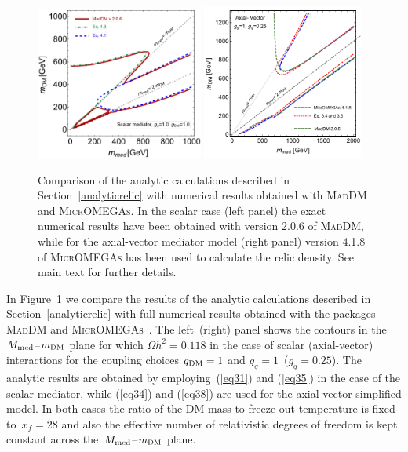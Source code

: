 \documentclass[a4paper, 11pt,notoc]{article}
\newcommand{\maddm}{\textsc{MadDM}\xspace}
\begin{document}
\begin{center}
\begin{figure}[t!]
\includegraphics[width=0.49\textwidth]{scalar_mediator_omegah2.pdf}
\includegraphics[width=0.47\textwidth]{AV_comparison2.pdf} 
\caption{Comparison of the analytic calculations described in Section~\ref{analyticrelic}  with numerical results obtained with \maddm and \textsc{MicrOMEGAs}. In the scalar case (left panel) the exact numerical results have been obtained with version 2.0.6 of \maddm, while for the axial-vector mediator model (right panel)
version 4.1.8 of \textsc{MicrOMEGAs} has been used to calculate the relic density. See main text for further details.}
\label{fig:analcalc}
\end{figure}
\end{center}

In Figure~\ref{fig:analcalc} we compare the results of the analytic calculations described in Section~\ref{analyticrelic}  with full numerical results obtained with the packages \maddm and \textsc{MicrOMEGAs}~\cite{Belanger:2014vza}. The left~(right) panel shows the contours in the $M_{\rm med}$--$m_{\rm DM}$ plane for which $\Omega h^2 = 0.118$ in the case of scalar (axial-vector) interactions for the coupling choices $g_{\rm DM} = 1$ and $g_q = 1$~($g_q = 0.25$). The analytic results are obtained by employing~(\ref{eq31}) and (\ref{eq35}) in the case of the scalar mediator, while (\ref{eq34}) and (\ref{eq38}) are used for the axial-vector simplified model. In both cases the ratio of the DM mass to freeze-out temperature is fixed to~$x_f = 28$ and also the effective number of relativistic degrees of freedom is kept constant across the~$M_{\rm med}$--$m_{\rm DM}$ plane.
\end{document}

